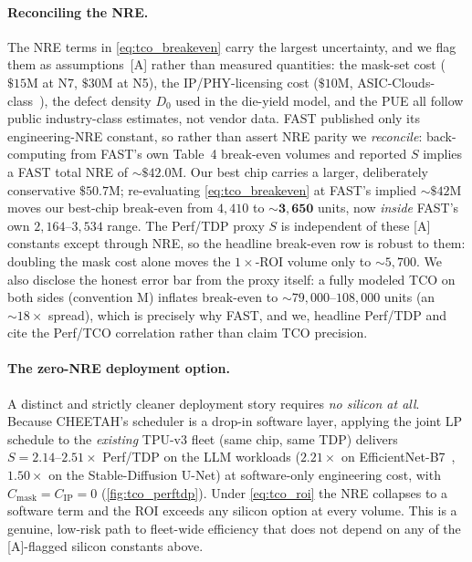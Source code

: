 \paragraph{Reconciling the NRE.}
\label{par:tco_nre}
The NRE terms in \cref{eq:tco_breakeven} carry the largest uncertainty, and we
flag them as assumptions~[A] rather than measured quantities: the mask-set cost
($\$15\mathrm{M}$ at N7, $\$30\mathrm{M}$ at N5), the IP/PHY-licensing cost
($\$10\mathrm{M}$, ASIC-Clouds-class~\citep{magaki2016asic}), the defect density
$D_0$ used in the die-yield model, and the PUE all follow public industry-class
estimates, not vendor data. FAST published only its engineering-NRE constant, so
rather than assert NRE parity we \emph{reconcile}: back-computing from FAST's own
Table~4 break-even volumes and reported $S$ implies a FAST total NRE of
${\sim}\$42.0\mathrm{M}$. Our best chip carries a larger, deliberately
conservative $\$50.7\mathrm{M}$; re-evaluating \cref{eq:tco_breakeven} at FAST's
implied ${\sim}\$42\mathrm{M}$ moves our best-chip break-even from $4{,}410$ to
$\mathbf{{\sim}3{,}650}$ units, now \emph{inside} FAST's own
$2{,}164\text{--}3{,}534$ range. The Perf/TDP proxy $S$ is independent of these
[A] constants except through NRE, so the headline break-even row is robust to
them: doubling the mask cost alone moves the $1\times$-ROI volume only to
${\sim}5{,}700$. We also disclose the honest error bar from the proxy itself: a
fully modeled TCO on both sides (convention M) inflates break-even to
${\sim}79{,}000\text{--}108{,}000$ units (an ${\sim}18\times$ spread), which is
precisely why FAST, and we, headline Perf/TDP and cite the Perf/TCO correlation
rather than claim TCO precision.

\paragraph{The zero-NRE deployment option.}
\label{par:tco_zeronre}
A distinct and strictly cleaner deployment story requires \emph{no silicon at
all}. Because CHEETAH's scheduler is a drop-in software layer, applying the joint
LP schedule to the \emph{existing} TPU-v3 fleet (same chip, same TDP) delivers
$S=2.14\text{--}2.51\times$ Perf/TDP on the LLM workloads ($2.21\times$ on
EfficientNet-B7~\citep{tan2019efficientnet}, $1.50\times$ on the Stable-Diffusion
U-Net) at software-only engineering cost, with $C_{\mathrm{mask}}=C_{\mathrm{IP}}=0$
(\cref{fig:tco_perftdp}). Under \cref{eq:tco_roi} the NRE collapses to a software
term and the ROI exceeds any silicon option at every volume. This is a genuine,
low-risk path to fleet-wide efficiency that does not depend on any of the
[A]-flagged silicon constants above.

